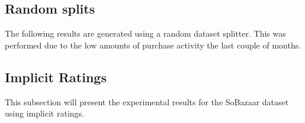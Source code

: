\subsection{Random splits}

The following results are generated using a random dataset splitter. This was performed due to the low amounts of purchase activity the last couple of months.


\subsection{Implicit Ratings}


This subsection will present the experimental results for the SoBazaar dataset using implicit ratings.











